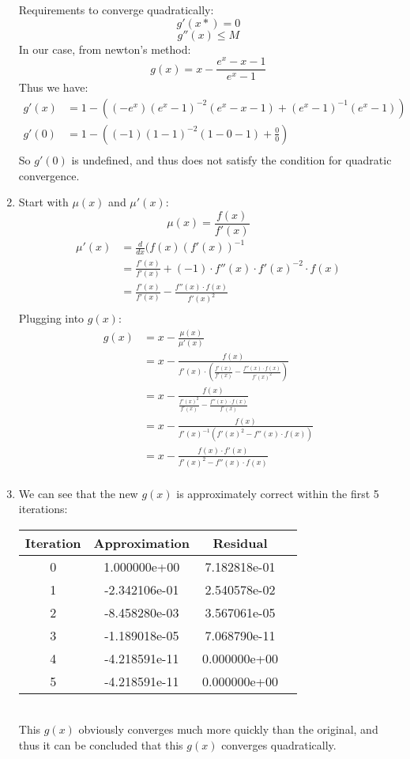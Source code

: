 \documentclass{article}
\begin{document}
\begin{enumerate}[label=\alph*.)]
Requirements to converge quadratically: \\
\[
g'(x*) = 0
\]
\[
g''(x) \leq M
\]
In our case, from newton's method: \\
\[
g(x) = x - \frac{e^x - x - 1}{e^x - 1}
\]
Thus we have:
\begin{align*}
g'(x) &= 1 - ((-e^x)(e^x-1)^{-2}(e^x-x-1) + (e^x - 1)^{-1}(e^x - 1)) \\
g'(0) &= 1 - ((-1)(1-1)^{-2}(1-0 - 1) + \frac{0}{0}) \\
\end{align*}
So $g'(0)$ is undefined, and thus does not satisfy the condition for quadratic convergence. \\
\item Start with $\mu(x)$ and $\mu'(x)$:
\[
\mu(x) = \frac{f(x)}{f'(x)}
\]
\begin{align*}
\mu'(x) &=\frac{d}{dx}(f(x)(f'(x))^{-1} \\
&= \frac{f'(x)}{f'(x)} + (-1)\cdot f''(x) \cdot f'(x)^{-2} \cdot f(x) \\
&= \frac{f'(x)}{f'(x)} - \frac{f''(x) \cdot f(x)}{f'(x)^2}\\
\end{align*}
Plugging into $g(x)$: \\
\begin{align*}
g(x) &= x - \frac{\mu(x)}{\mu'(x)} \\
&= x - \frac{f(x)}{f'(x) \cdot ( \frac{f'(x)}{f'(x)} - \frac{f''(x) \cdot f(x)}{f'(x)^2})}\\
&= x - \frac{f(x)}{\frac{f'(x)^2}{f'(x)} - \frac{f''(x) \cdot f(x)}{f'(x)}} \\
&=  x - \frac{f(x)}{f'(x)^{-1}(f'(x)^2 - f''(x) \cdot f(x))} \\
&= x - \frac{f(x) \cdot f'(x)}{f'(x)^2 - f''(x) \cdot f(x)} \\
\end{align*}
\item We can see that the new $g(x)$ is approximately correct within the first 5 iterations: \\
\begin{tabular}{|c|c|c|c|}
\hline
Iteration & Approximation & Residual\\
\hline
0 & 1.000000e+00 & 7.182818e-01\\
\hline
1 & -2.342106e-01 & 2.540578e-02\\
\hline
2 & -8.458280e-03 & 3.567061e-05\\
\hline
3 & -1.189018e-05 & 7.068790e-11\\
\hline
4 & -4.218591e-11 & 0.000000e+00\\
\hline
5 & -4.218591e-11 & 0.000000e+00\\
\hline
\end{tabular} \\
This $g(x)$ obviously converges much more quickly than the original, and thus it can be concluded that this $g(x)$ converges quadratically. 
\end{enumerate}
\end{document}
